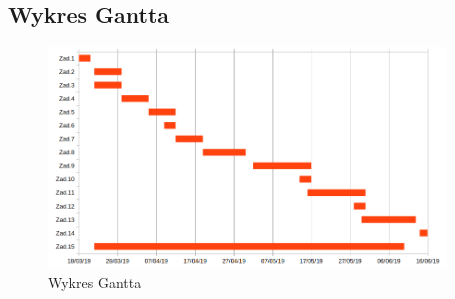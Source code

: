 \documentclass[10pt, a4paper]{article}
\begin{document}
\subsection{Wykres Gantta}
    \begin{figure}[h]
    \centering
	\includegraphics[width=0.94\textwidth]{wizualizacja_gantt.png}
	\caption{Wykres Gantta}
\end{figure}
\newpage
\end{document}
